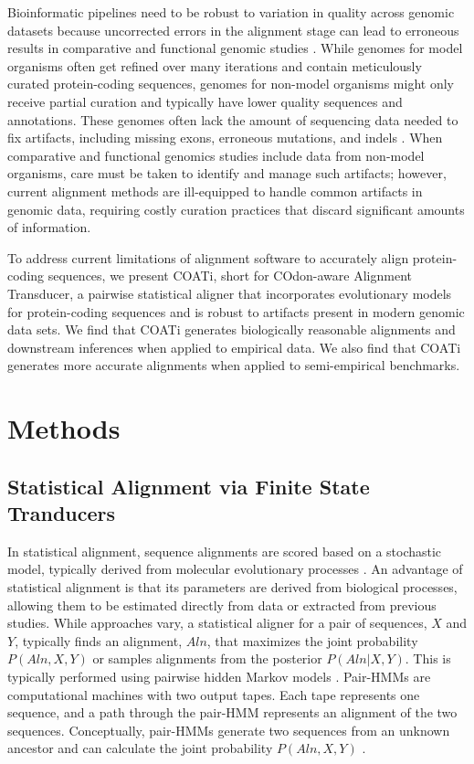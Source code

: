 \documentclass[12pt,letterpaper]{article}
\begin{document}
Bioinformatic pipelines need to be robust to variation in quality across genomic datasets because uncorrected errors in the alignment stage can lead to erroneous results in comparative and functional genomic studies \citep{estimates_schneider_2009, effect_fletcher_2010, hubisz2011error}.
While genomes for model organisms often get refined over many iterations and contain meticulously curated protein-coding sequences, 
genomes for non-model organisms might only receive partial curation and typically have lower quality sequences and annotations.
These genomes often lack the amount of sequencing data needed to fix artifacts, including missing exons, erroneous mutations, and indels \citep{jackman2018tigmint}.
%
When comparative and functional genomics studies include data from non-model organisms, care must be taken to identify and manage such artifacts; however,
current alignment methods are ill-equipped to handle common artifacts in genomic data, requiring costly curation practices that discard significant amounts of information.

To address current limitations of alignment software to accurately align protein-coding sequences, we present COATi, short for COdon-aware Alignment Transducer, a pairwise statistical aligner that incorporates evolutionary models for protein-coding sequences and is robust to artifacts present in modern genomic data sets. We find that COATi generates biologically reasonable alignments and downstream inferences when applied to empirical data. We also find that COATi generates more accurate alignments when applied to semi-empirical benchmarks.


\section*{Methods}

\subsection*{Statistical Alignment via Finite State Tranducers}

In statistical alignment, sequence alignments are scored based on a stochastic model, typically derived from molecular evolutionary processes \citep{hein2001algorithm,holmes2001evolutionary,Lunter2005-hk,demaio2021cumulative}. An advantage of statistical alignment is that its parameters are derived from biological processes, allowing them to be estimated directly from data or extracted from previous studies. While approaches vary, a statistical aligner for a pair of sequences, $X$ and $Y$, typically finds an alignment, $Aln$, that maximizes the joint probability $P(Aln, X, Y)$ or samples alignments from the posterior $P(Aln | X, Y)$. This is typically performed using pairwise hidden Markov models \citep[pair-HMMs;][]{holmes2001evolutionary,redelings2007incorporating,problems_cartwright_2009}. Pair-HMMs are computational machines with two output tapes. Each tape represents one sequence, and a path through the pair-HMM represents an alignment of the two sequences. Conceptually, pair-HMMs generate two sequences from an unknown ancestor and can calculate the joint probability $P(Aln, X, Y)$ \citep{yoon_2009_hmm}.
\end{document}
